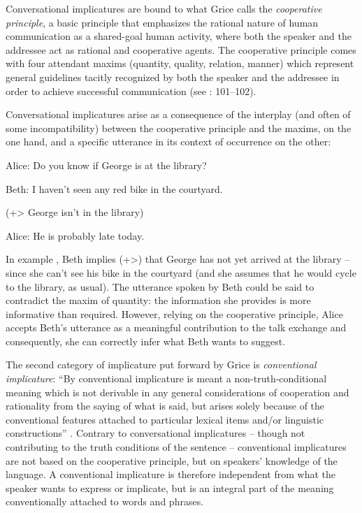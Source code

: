 Conversational implicatures are bound to what Grice calls the \textit{cooperative principle}, a basic principle that emphasizes the rational nature of human communication as a shared-goal human activity, where both the speaker and the addressee act as rational and cooperative agents. The cooperative principle comes with four attendant maxims (quantity, quality, relation, manner) which represent general guidelines tacitly recognized by both the speaker and the addressee in order to achieve successful communication (see \citealt{Levinson1983}: 101–102).

Conversational implicatures arise as a consequence of the interplay (and often of some incompatibility) between the cooperative principle and the maxims, on the one hand, and a specific utterance in its context of occurrence on the other:

\ea%
    \label{ex:key:4}

          Alice:  Do you know if George is at the library?

Beth:  I haven’t seen any red bike in the courtyard.

(+> George isn’t in the library)

  Alice:  He is probably late today.
    \z %

In example , Beth implies (+>) that George has not yet arrived at the library – since she can’t see his bike in the courtyard (and she assumes that he would cycle to the library, as usual). The utterance spoken by Beth could be said to contradict the maxim of quantity: the information she provides is more informative than required. However, relying on the cooperative principle, Alice accepts Beth’s utterance as a meaningful contribution to the talk exchange and consequently, she can correctly infer what Beth wants to suggest.

The second category of implicature put forward by Grice is \textit{conventional implicature}: “By conventional implicature is meant a non-truth-conditional meaning which is not derivable in any general considerations of cooperation and rationality from the saying of what is said, but arises solely because of the conventional features attached to particular lexical items and/or linguistic constructions” \citep[176]{Huang2017}. Contrary to conversational implicatures – though not contributing to the truth conditions of the sentence – conventional implicatures are not based on the cooperative principle, but on speakers’ knowledge of the language. A conventional implicature is therefore independent from what the speaker wants to express or implicate, but is an integral part of the meaning conventionally attached to words and phrases.

